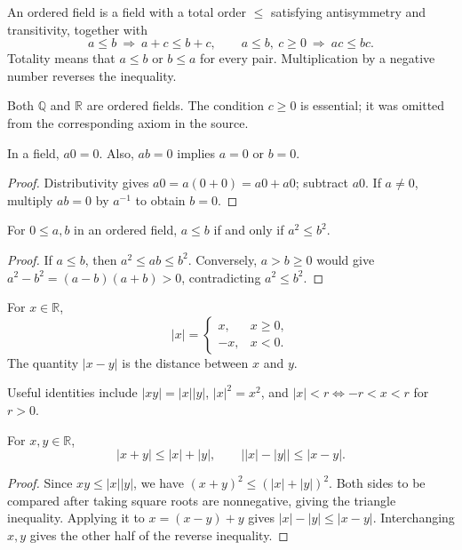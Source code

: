 \begin{definition}
An ordered field is a field with a total order $\leq$ satisfying
antisymmetry and transitivity, together with
\[
a\leq b\ \Longrightarrow\ a+c\leq b+c,
\qquad
a\leq b,\ c\geq0\ \Longrightarrow\ ac\leq bc.
\]
Totality means that $a\leq b$ or $b\leq a$ for every pair. Multiplication by
a negative number reverses the inequality.
\end{definition}
Both $\mathbb Q$ and $\mathbb R$ are ordered fields. The condition $c\geq0$
is essential; it was omitted from the corresponding axiom in the source.

\begin{lemma}
In a field, $a0=0$. Also, $ab=0$ implies $a=0$ or $b=0$.
\end{lemma}
\begin{proof}
Distributivity gives $a0=a(0+0)=a0+a0$; subtract $a0$. If $a\ne0$, multiply
$ab=0$ by $a^{-1}$ to obtain $b=0$.
\end{proof}

\begin{lemma}
For $0\leq a,b$ in an ordered field, $a\leq b$ if and only if $a^2\leq b^2$.
\end{lemma}
\begin{proof}
If $a\leq b$, then $a^2\leq ab\leq b^2$. Conversely, $a>b\geq0$ would give
$a^2-b^2=(a-b)(a+b)>0$, contradicting $a^2\leq b^2$.
\end{proof}

\begin{definition}
For $x\in\mathbb R$,
\[
|x|=\begin{cases}x,&x\geq0,\\-x,&x<0.\end{cases}
\]
The quantity $|x-y|$ is the distance between $x$ and $y$.
\end{definition}
Useful identities include $|xy|=|x||y|$, $|x|^2=x^2$, and
$|x|<r\iff-r<x<r$ for $r>0$.

\begin{proposition}
For $x,y\in\mathbb R$,
\[
|x+y|\leq|x|+|y|,\qquad
\bigl||x|-|y|\bigr|\leq|x-y|.
\]
\end{proposition}
\begin{proof}
Since $xy\leq|x||y|$, we have
$(x+y)^2\leq(|x|+|y|)^2$. Both sides to be compared after taking square
roots are nonnegative, giving the triangle inequality.
Applying it to $x=(x-y)+y$ gives $|x|-|y|\leq|x-y|$.
Interchanging $x,y$ gives the other half of the reverse inequality.
\end{proof}

